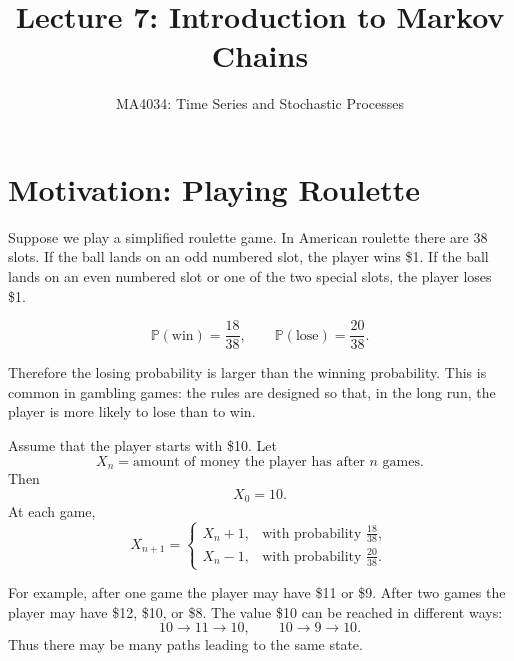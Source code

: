 \documentclass[12pt,a4paper]{article}
\title{\textbf{Lecture 7: Introduction to Markov Chains}}
\author{MA4034: Time Series and Stochastic Processes}
\date{}
\theoremstyle{lecturestyle}
\newcommand{\Prob}{\mathbb{P}}
\begin{document}
\maketitle

\section{Motivation: Playing Roulette}

Suppose we play a simplified roulette game. In American roulette there are 38 slots. If the ball lands on an odd numbered slot, the player wins \$1. If the ball lands on an even numbered slot or one of the two special slots, the player loses \$1.

\[
\Prob(\text{win})=\frac{18}{38}, \qquad
\Prob(\text{lose})=\frac{20}{38}.
\]

Therefore the losing probability is larger than the winning probability. This is common in gambling games: the rules are designed so that, in the long run, the player is more likely to lose than to win.

Assume that the player starts with \$10. Let
\[
X_n=\text{amount of money the player has after } n \text{ games}.
\]
Then
\[
X_0=10.
\]
At each game,
\[
X_{n+1}=
\begin{cases}
X_n+1, & \text{with probability } \frac{18}{38},\\
X_n-1, & \text{with probability } \frac{20}{38}.
\end{cases}
\]

For example, after one game the player may have \$11 or \$9. After two games the player may have \$12, \$10, or \$8. The value \$10 can be reached in different ways:
\[
10 \rightarrow 11 \rightarrow 10,
\qquad
10 \rightarrow 9 \rightarrow 10.
\]
Thus there may be many paths leading to the same state.

\begin{center}
\end{center}
\end{document}
